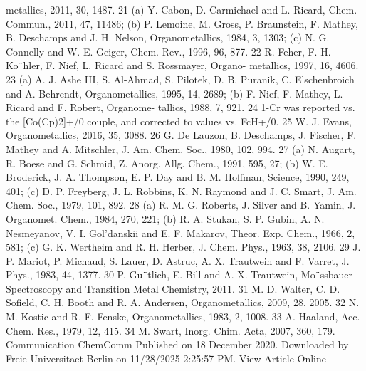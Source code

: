 \documentclass{article}
\begin{document}
metallics, 2011, 30, 1487.
21 (a) Y. Cabon, D. Carmichael and L. Ricard, Chem. Commun., 2011,
47, 11486; (b) P. Lemoine, M. Gross, P. Braunstein, F. Mathey,
B. Deschamps and J. H. Nelson, Organometallics, 1984, 3, 1303;
(c) N. G. Connelly and W. E. Geiger, Chem. Rev., 1996, 96, 877.
22 R. Feher, F. H. Ko¨hler, F. Nief, L. Ricard and S. Rossmayer, Organo-
metallics, 1997, 16, 4606.
23 (a) A. J. Ashe III, S. Al-Ahmad, S. Pilotek, D. B. Puranik,
C.
Elschenbroich
and
A.
Behrendt,
Organometallics,
1995,
14, 2689; (b) F. Nief, F. Mathey, L. Ricard and F. Robert, Organome-
tallics, 1988, 7, 921.
24 1-Cr was reported vs. the [Co(Cp)2]+/0 couple, and corrected to values
vs. FcH+/0.
25 W. J. Evans, Organometallics, 2016, 35, 3088.
26 G. De Lauzon, B. Deschamps, J. Fischer, F. Mathey and A. Mitschler,
J. Am. Chem. Soc., 1980, 102, 994.
27 (a) N. Augart, R. Boese and G. Schmid, Z. Anorg. Allg. Chem., 1991,
595, 27; (b) W. E. Broderick, J. A. Thompson, E. P. Day and
B. M. Hoﬀman, Science, 1990, 249, 401; (c) D. P. Freyberg,
J. L. Robbins, K. N. Raymond and J. C. Smart, J. Am. Chem. Soc.,
1979, 101, 892.
28 (a) R. M. G. Roberts, J. Silver and B. Yamin, J. Organomet. Chem.,
1984, 270, 221; (b) R. A. Stukan, S. P. Gubin, A. N. Nesmeyanov,
V. I. Gol’danskii and E. F. Makarov, Theor. Exp. Chem., 1966, 2, 581;
(c) G. K. Wertheim and R. H. Herber, J. Chem. Phys., 1963, 38,
2106.
29 J. P. Mariot, P. Michaud, S. Lauer, D. Astruc, A. X. Trautwein and
F. Varret, J. Phys., 1983, 44, 1377.
30 P. Gu¨tlich, E. Bill and A. X. Trautwein, Mo¨ssbauer Spectroscopy and
Transition Metal Chemistry, 2011.
31 M. D. Walter, C. D. Sofield, C. H. Booth and R. A. Andersen,
Organometallics, 2009, 28, 2005.
32 N. M. Kostic and R. F. Fenske, Organometallics, 1983, 2, 1008.
33 A. Haaland, Acc. Chem. Res., 1979, 12, 415.
34 M. Swart, Inorg. Chim. Acta, 2007, 360, 179.
Communication
ChemComm
Published on 18 December 2020. Downloaded by Freie Universitaet Berlin on 11/28/2025 2:25:57 PM. 
View Article Online

\newpage
\end{document}
